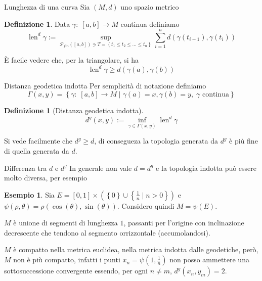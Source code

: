 \documentclass{beamer}
\newcounter{counter1}
\theoremstyle{plain}
\theoremstyle{definition}
\newtheorem{mydef}[counter1]{Definizione}
\newtheorem{myes}[counter1]{Esempio}
\theoremstyle{remark}
\newcommand{\set}[1]{\left\{#1\right\}}
\newcommand{\pa}[1]{\left(#1\right)}
\newcommand{\bra}[1]{\left[#1\right]}
\DeclareMathOperator{\len}{len}
\begin{document}
\begin{frame}{Lunghezza di una curva}
  Sia $(M,d)$ uno spazio metrico
  \begin{mydef}
    Data $\gamma : \; \bra{a,b} \to M$ continua definiamo
    \[ \len^d \gamma := \sup _{\mathcal{P}_{fin}(\bra{a,b}) \ni T =
      \set{t_1 \le t_2 \le ... \le t_n}} \sum_{i=1}^n d\pa{
      \gamma\pa{t_{i-1}}, \gamma\pa{t_i}} \]
  \end{mydef}
  È facile vedere che, per la triangolare, si ha
  \[ \len^d \gamma \ge d\pa{\gamma\pa{a}, \gamma\pa{b}} \]

\end{frame}

\begin{frame}{Distanza geodetica indotta}
  Per semplicità di notazione definiamo
  \[ \Gamma (x,y) = \set{\gamma:\; \bra{a,b} \to M \mid
    \gamma(a) = x, \gamma(b) = y,\; \gamma \text{ continua}} \]
  
  \begin{mydef}[Distanza geodetica indotta]
    \[ d^g (x,y) := \inf _{\gamma \in \Gamma(x,y)} \len^d \gamma \]
  \end{mydef}

  Si vede facilmente che $d^g \ge d$, di consegueza la topologia
  generata da $d^g$ è più fine di quella generata da $d$.
\end{frame}

\begin{frame}{Differenza tra $d$ e $d^g$}
  In generale non vale $d=d^g$ e la topologia indotta può essere molto
  diversa, per esempio
  
  \begin{myes}%
    Sia $E = \bra{0,1} \times \pa{ \set{0} \cup \set{ \frac{1}{n} \mid n
        > 0} }$ e $\psi(\rho,\theta) = \rho
    \pa{\cos(\theta),\sin(\theta)}$. Considero quindi $M = \psi(E)$.
    
    $M$ è unione di segmenti di lunghezza $1$, passanti per l'origine
    con inclinazione decrescente che tendono al segmento orrizzontale
    (accumolandosi). 
    
    $M$ è compatto nella metrica euclidea, nella metrica indotta dalle
    geodetiche, però, $M$ non è più compatto, infatti i punti $x_n =
    \psi(1,\frac{1}{n})$ non posso ammettere una sottosuccessione
    convergente essendo, per ogni $n\neq m$, $d^g(x_n,y_m) = 2$.
  \end{myes}
\end{frame}
\end{document}
